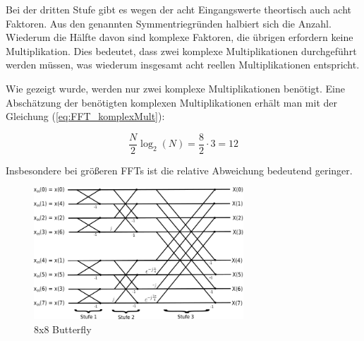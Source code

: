 Bei der dritten Stufe gibt es wegen der acht Eingangswerte theortisch auch acht Faktoren. Aus den genannten Symmentriegründen halbiert sich die Anzahl. Wiederum die Hälfte davon 
sind komplexe Faktoren, die übrigen erfordern keine Multiplikation. Dies bedeutet, dass zwei komplexe Multiplikationen durchgeführt werden müssen, was wiederum insgesamt acht reellen 
Multiplikationen entspricht. 


Wie gezeigt wurde, werden nur zwei komplexe Multiplikationen benötigt. Eine Abschätzung der benötigten komplexen Multiplikationen erhält man mit der Gleichung (\ref{eq:FFT_komplexMult}):

\begin{equation}\label{eq:FFT_komplexMult}
 \frac{N}{2}\log_2(N) = \frac{8}{2}\cdot 3 = 12
\end{equation}

Insbesondere bei größeren FFTs ist die relative Abweichung bedeutend geringer.


\begin{figure}[htbp]
 \centering
 \includegraphics[width=0.7\textwidth]{img/Butterfly.png}
 \caption{8x8 Butterfly}
 \label{pic:Butterfly}
\end{figure}


